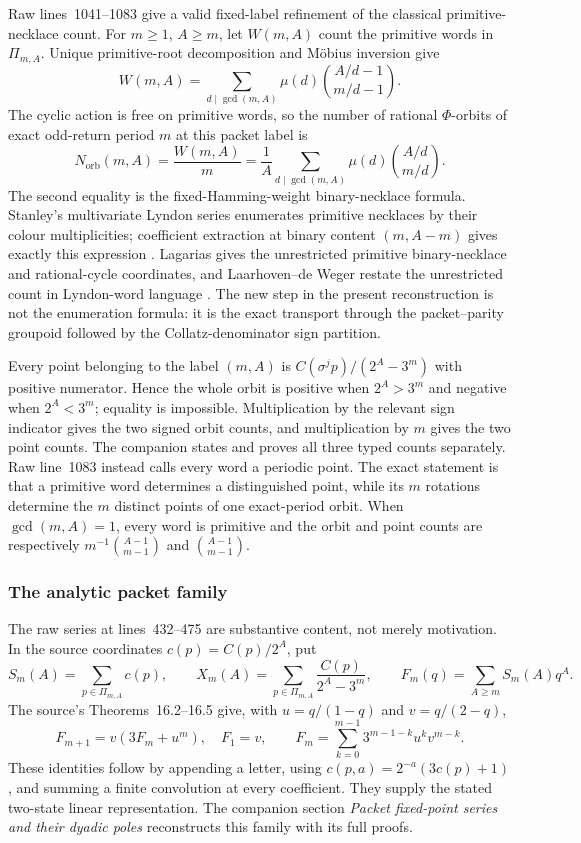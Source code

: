 Raw lines~1041--1083 give a valid fixed-label refinement of the classical
primitive-necklace count.  For $m\geq1$, $A\geq m$, let $W(m,A)$ count the
primitive words in $\Pi_{m,A}$.  Unique primitive-root decomposition and
M\"obius inversion give
\[
 W(m,A)=\sum_{d\mid\gcd(m,A)}\mu(d)
          \binom{A/d-1}{m/d-1}.
\]
The cyclic action is free on primitive words, so the number of rational
$\Phi$-orbits of exact odd-return period $m$ at this packet label is
\[
 N_{\mathrm{orb}}(m,A)
 =\frac{W(m,A)}m
 =\frac1A\sum_{d\mid\gcd(m,A)}\mu(d)
          \binom{A/d}{m/d}.
\]
The second equality is the fixed-Hamming-weight binary-necklace formula.
Stanley's multivariate Lyndon series enumerates primitive necklaces by their
colour multiplicities; coefficient extraction at binary content $(m,A-m)$
gives exactly this expression
\cite[Exercise~7.89(a), equations~(7.149)--(7.150), and the solution on
printed p.~555]{Stanley2024}.  Lagarias gives the unrestricted primitive
binary-necklace and rational-cycle coordinates, and Laarhoven--de Weger
restate the unrestricted count in Lyndon-word language
\cite[pp.~38--39]{Lagarias1990}\cite{LaarhovenDeWeger2012}.  The new step in
the present reconstruction is not the enumeration formula: it is the exact
transport through the packet--parity groupoid followed by the
Collatz-denominator sign partition.

Every point belonging to the label $(m,A)$ is
$C(\sigma^jp)/(2^A-3^m)$ with positive numerator.  Hence the whole orbit is
positive when $2^A>3^m$ and negative when $2^A<3^m$; equality is impossible.
Multiplication by the relevant sign indicator gives the two signed orbit
counts, and multiplication by $m$ gives the two point counts.  The companion
states and proves all three typed counts separately.  Raw line~1083 instead
calls every word a periodic point.  The exact statement is that a primitive
word determines a distinguished point, while its $m$ rotations determine the
$m$ distinct points of one exact-period orbit.  When $\gcd(m,A)=1$, every
word is primitive and the orbit and point counts are respectively
$m^{-1}\binom{A-1}{m-1}$ and $\binom{A-1}{m-1}$.

\subsubsection{The analytic packet family}

The raw series at lines~432--475 are substantive content, not merely
motivation.  In the source coordinates $c(p)=C(p)/2^A$, put
\[
 S_m(A)=\sum_{p\in\Pi_{m,A}}c(p),\qquad
 X_m(A)=\sum_{p\in\Pi_{m,A}}\frac{C(p)}{2^A-3^m},\qquad
 F_m(q)=\sum_{A\ge m}S_m(A)q^A.
\]
The source's Theorems~16.2--16.5 give, with
$u=q/(1-q)$ and $v=q/(2-q)$,
\[
 F_{m+1}=v(3F_m+u^m),\quad F_1=v,\qquad
 F_m=\sum_{k=0}^{m-1}3^{m-1-k}u^kv^{m-k}.
\]
These identities follow by appending a letter, using
$c(p,a)=2^{-a}(3c(p)+1)$, and summing a finite convolution at every
coefficient.  They supply the stated two-state linear representation.
The companion section \emph{Packet fixed-point series and their dyadic
poles} reconstructs this family with its full proofs.

